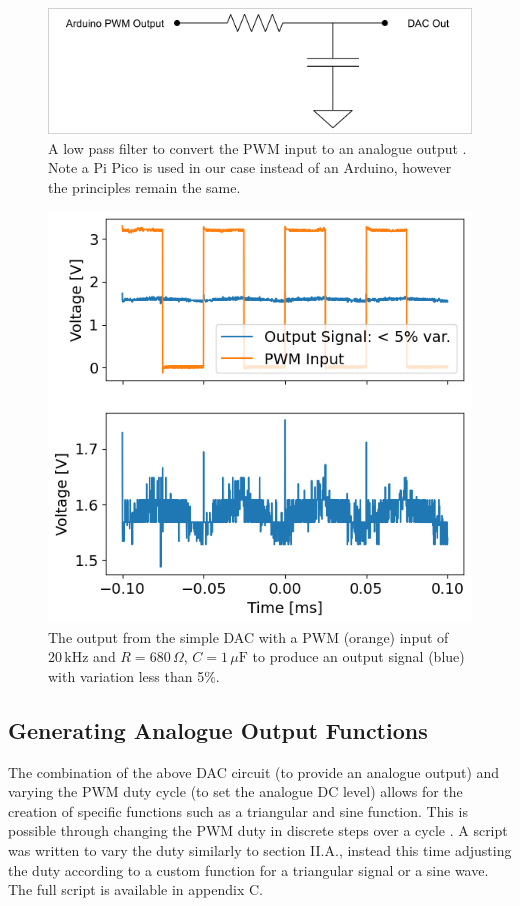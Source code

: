 \documentclass[%
 reprint,
 amsmath,amssymb,
 aps,
]{revtex4-2}
\begin{document}
    \begin{figure}
        \includegraphics[width=0.9\columnwidth]{Images/dac.png}
        \caption{\label{fig:DAC}A low pass filter to convert the PWM input to an analogue output \cite{ucd}. Note a Pi Pico is used in our case instead of an Arduino, however the principles remain the same.}
    \end{figure}
    \begin{figure}
        \includegraphics[width=0.9\columnwidth]{Images/dacVariations.png}
        \caption{\label{fig:dacVariations} The output from the simple DAC with a PWM (orange) input of $20\,\text{kHz}$ and $R=680\,\Omega$, $C=1\,\mu\text{F}$ to produce an output signal (blue) with variation less than 5\%.}
    \end{figure}

    \subsection{Generating Analogue Output Functions}
    The combination of the above DAC circuit (to provide an analogue output) and varying the PWM duty cycle (to set the analogue DC level) allows for the creation of specific functions such as a triangular and sine function. This is possible through changing the PWM duty in discrete steps over a cycle \cite{ucd}. A script was written to vary the duty similarly to section II.A., instead this time adjusting the duty according to a custom function for a triangular signal or a sine wave. The full script is available in appendix C.
\end{document}
